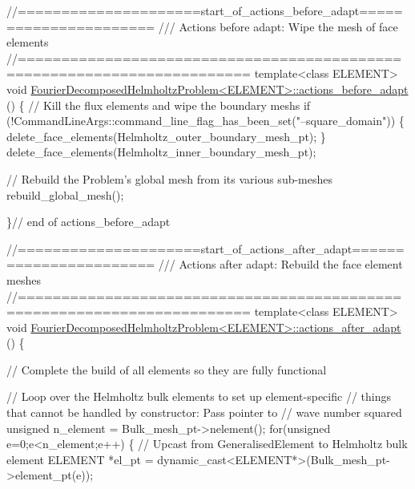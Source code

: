 \begin{DoxyCodeInclude}
\textcolor{comment}{//=====================start\_of\_actions\_before\_adapt======================}\textcolor{comment}{}
\textcolor{comment}{/// Actions before adapt: Wipe the mesh of face elements}
\textcolor{comment}{}\textcolor{comment}{//========================================================================}
\textcolor{keyword}{template}<\textcolor{keyword}{class} ELEMENT>
\textcolor{keywordtype}{void} \hyperlink{classFourierDecomposedHelmholtzProblem_acbc6f3c692463e5a098ccec7fe9029c1}{FourierDecomposedHelmholtzProblem<ELEMENT>::actions\_before\_adapt}
      ()
\{ 
 \textcolor{comment}{// Kill the flux elements and wipe the boundary meshs}
 \textcolor{keywordflow}{if} (!CommandLineArgs::command\_line\_flag\_has\_been\_set(\textcolor{stringliteral}{"--square\_domain"}))
  \{
   delete\_face\_elements(Helmholtz\_outer\_boundary\_mesh\_pt);
  \}
 delete\_face\_elements(Helmholtz\_inner\_boundary\_mesh\_pt);

 \textcolor{comment}{// Rebuild the Problem's global mesh from its various sub-meshes}
 rebuild\_global\_mesh();

\}\textcolor{comment}{// end of actions\_before\_adapt}


\textcolor{comment}{//=====================start\_of\_actions\_after\_adapt=======================}\textcolor{comment}{}
\textcolor{comment}{///  Actions after adapt: Rebuild the face element meshes}
\textcolor{comment}{}\textcolor{comment}{//========================================================================}
\textcolor{keyword}{template}<\textcolor{keyword}{class} ELEMENT>
\textcolor{keywordtype}{void} \hyperlink{classFourierDecomposedHelmholtzProblem_a3258e3817d8747aac0409eca1a24d14b}{FourierDecomposedHelmholtzProblem<ELEMENT>::actions\_after\_adapt}
      ()
\{


 \textcolor{comment}{// Complete the build of all elements so they are fully functional}
 
 \textcolor{comment}{// Loop over the Helmholtz bulk elements to set up element-specific }
 \textcolor{comment}{// things that cannot be handled by constructor: Pass pointer to }
 \textcolor{comment}{// wave number squared}
 \textcolor{keywordtype}{unsigned} n\_element = Bulk\_mesh\_pt->nelement();
 \textcolor{keywordflow}{for}(\textcolor{keywordtype}{unsigned} e=0;e<n\_element;e++)
  \{
   \textcolor{comment}{// Upcast from GeneralisedElement to Helmholtz bulk element}
   ELEMENT *el\_pt = \textcolor{keyword}{dynamic\_cast<}ELEMENT*\textcolor{keyword}{>}(Bulk\_mesh\_pt->element\_pt(e));
   

\end{DoxyCodeInclude}
